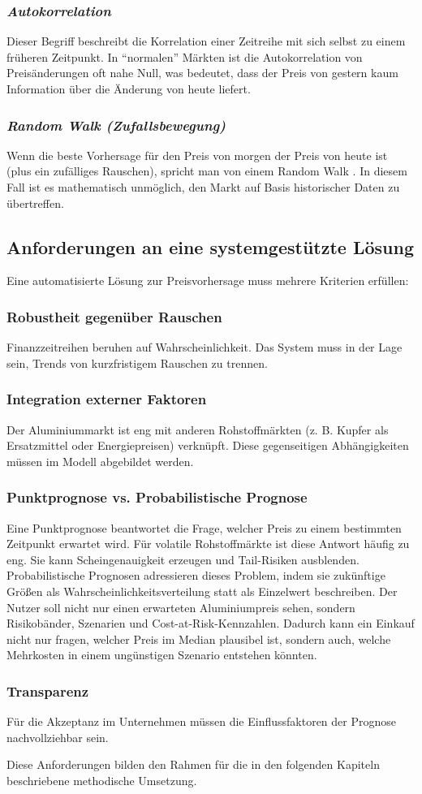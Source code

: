 \subsubsection{\emph{Autokorrelation}}

Dieser Begriff beschreibt die Korrelation einer Zeitreihe mit sich selbst zu einem früheren Zeitpunkt.
In "`normalen"' Märkten ist die Autokorrelation von Preisänderungen oft nahe Null, was bedeutet, dass der Preis von gestern kaum Information über die Änderung von heute liefert.

\subsubsection{\emph{Random Walk (Zufallsbewegung)}}
Wenn die beste Vorhersage für den Preis von morgen der Preis von heute ist (plus ein zufälliges Rauschen), spricht man von einem Random Walk \cite{Random1973}.
In diesem Fall ist es mathematisch unmöglich, den Markt auf Basis historischer Daten zu übertreffen.


\subsection{Anforderungen an eine systemgestützte Lösung}

Eine automatisierte Lösung zur Preisvorhersage muss mehrere Kriterien erfüllen:

\subsubsection{Robustheit gegenüber Rauschen}
Finanzzeitreihen beruhen auf Wahrscheinlichkeit.
Das System muss in der Lage sein, Trends von kurzfristigem Rauschen zu trennen.

\subsubsection{Integration externer Faktoren}
Der Aluminiummarkt ist eng mit anderen Rohstoffmärkten (z. B. Kupfer als Ersatzmittel oder Energiepreisen) verknüpft.
Diese gegenseitigen Abhängigkeiten müssen im Modell abgebildet werden.

\subsubsection{Punktprognose vs. Probabilistische Prognose}
Eine Punktprognose beantwortet die Frage, welcher Preis zu einem bestimmten Zeitpunkt erwartet wird. Für volatile Rohstoffmärkte ist diese Antwort häufig zu eng. Sie kann Scheingenauigkeit erzeugen und Tail-Risiken ausblenden. Probabilistische Prognosen adressieren dieses Problem, indem sie zukünftige Größen als Wahrscheinlichkeitsverteilung statt als Einzelwert beschreiben.
Der Nutzer soll nicht nur einen erwarteten Aluminiumpreis sehen, sondern Risikobänder, Szenarien und Cost-at-Risk-Kennzahlen. Dadurch kann ein Einkauf nicht nur fragen, welcher Preis im Median plausibel ist, sondern auch, welche Mehrkosten in einem ungünstigen Szenario entstehen könnten.

\subsubsection{Transparenz}
Für die Akzeptanz im Unternehmen müssen die Einflussfaktoren der Prognose nachvollziehbar sein.

Diese Anforderungen bilden den Rahmen für die in den folgenden Kapiteln beschriebene methodische Umsetzung.
